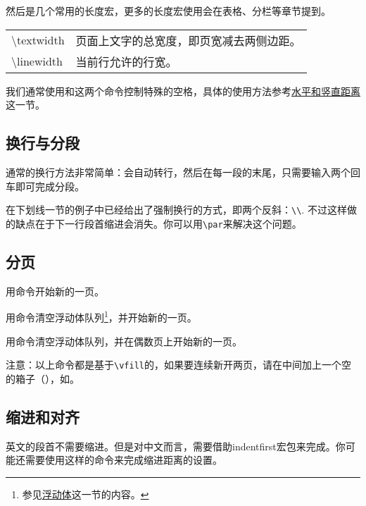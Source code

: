 {然后是几个常用的长度宏，更多的长度宏使用会在表格、分栏等章节提到。

\begin{center}
\begin{tabular}{|ll|}
\hline
\textbackslash{}textwidth & 页面上文字的总宽度，即页宽减去两侧边距。\\
\textbackslash{}linewidth & 当前行允许的行宽。\\
\hline
\end{tabular}
\end{center}

我们通常使用\latexline{\\hspace{len}}和\latexline{\\vspace{len}}这两个命令控制特殊的空格，具体的使用方法参考\hyperref[sec:hvspace]{水平和竖直距离}这一节。

\subsection{换行与分段}
通常的换行方法非常简单：会自动转行，然后在每一段的末尾，只需要输入两个回车即可完成分段。

在下划线一节的例子中已经给出了强制换行的方式，即两个反斜：\verb|\\|. 不过这样做的缺点在于下一行段首缩进会消失。你可以用\verb|\par|来解决这个问题。

\subsection{分页}
用\latexline{\\newpage}命令开始新的一页。

用\latexline{\\clearpage}命令清空浮动体队列\footnote{参见\hyperref[sec:float]{浮动体}这一节的内容。}，并开始新的一页。

用\latexline{\\cleardoublepage}命令清空浮动体队列，并在偶数页上开始新的一页。

注意：以上命令都是基于\verb|\vfill|的，如果要连续新开两页，请在中间加上一个空的箱子（\latexline{\\mbox{}}），如\latexline{\\newpage\\mbox{}\\newpage}。

\subsection{缩进和对齐}
英文的段首不需要缩进。但是对中文而言，需要借助indentfirst宏包来完成。你可能还需要使用\latexline{\\setlength{\indent}{2em}}这样的命令来完成缩进距离的设置。

}
